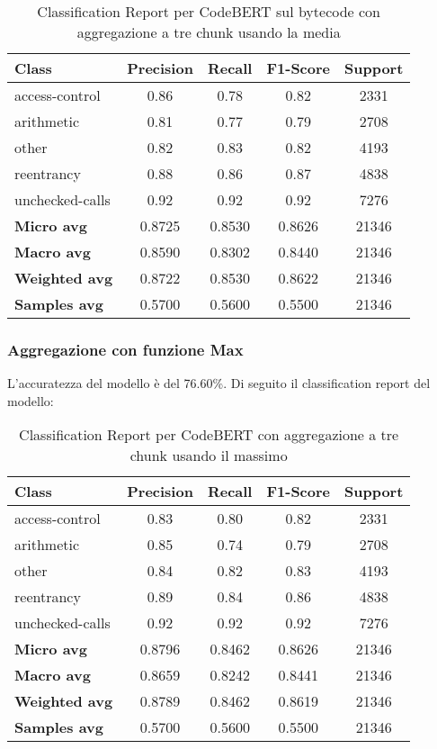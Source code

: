 \documentclass[../../Thesis.tex]{subfiles}
\begin{document}
    \begin{table}[H]
        \centering
        \small
        \begin{tabular}{lcccc}
        \hline
        \textbf{Class} & \textbf{Precision} & \textbf{Recall} & \textbf{F1-Score} & \textbf{Support} \\
        \hline
        access-control & 0.86 & 0.78 & 0.82 & 2331 \\
        arithmetic & 0.81 & 0.77 & 0.79 & 2708 \\
        other & 0.82 & 0.83 & 0.82 & 4193 \\
        reentrancy & 0.88 & 0.86 & 0.87 & 4838 \\
        unchecked-calls & 0.92 & 0.92 & 0.92 & 7276 \\
        \hline
        \textbf{Micro avg} & 0.8725 & 0.8530 & 0.8626 & 21346 \\
        \textbf{Macro avg} & 0.8590 & 0.8302 & 0.8440 & 21346 \\
        \textbf{Weighted avg} & 0.8722 & 0.8530 & 0.8622 & 21346 \\
        \textbf{Samples avg} & 0.5700 & 0.5600 & 0.5500 & 21346 \\
        \hline
        \end{tabular}
        \caption{Classification Report per CodeBERT sul bytecode con aggregazione a tre chunk usando la media}
    \end{table}
        
        
    
\subsubsection{Aggregazione con funzione Max}
L'accuratezza del modello è del 76.60\%. Di seguito il classification report del modello:
\begin{table}[H]
\centering
\small
\begin{tabular}{lcccc}
\hline
\textbf{Class} & \textbf{Precision} & \textbf{Recall} & \textbf{F1-Score} & \textbf{Support} \\
\hline
access-control & 0.83 & 0.80 & 0.82 & 2331 \\
arithmetic & 0.85 & 0.74 & 0.79 & 2708 \\
other & 0.84 & 0.82 & 0.83 & 4193 \\
reentrancy & 0.89 & 0.84 & 0.86 & 4838 \\
unchecked-calls & 0.92 & 0.92 & 0.92 & 7276 \\
\hline
\textbf{Micro avg} & 0.8796 & 0.8462 & 0.8626 & 21346 \\
\textbf{Macro avg} & 0.8659 & 0.8242 & 0.8441 & 21346 \\
\textbf{Weighted avg} & 0.8789 & 0.8462 & 0.8619 & 21346 \\
\textbf{Samples avg} & 0.5700 & 0.5600 & 0.5500 & 21346 \\
\hline
\end{tabular}
\caption{Classification Report per CodeBERT con aggregazione a tre chunk usando il massimo}
\end{table}
\end{document}
